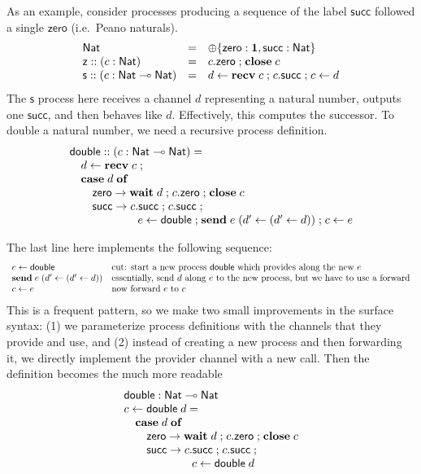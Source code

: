 \documentclass[submission,copyright,creativecommons]{eptcs}
\newcommand{\m}[1]{\mathsf{#1}}
\newcommand{\mb}[1]{\mbox{\bf #1}}
\newcommand{\semi}{\mathrel{;}}
\begin{document}
As an example, consider processes producing a sequence of the label $\m{succ}$ followed a single $\m{zero}$ (i.e.\ Peano naturals).
\[
\begin{array}{lcl}
\m{Nat} & = & \oplus\{\m{zero} : \terminate, \m{succ} : \m{Nat}\} \\
\m{z} :: (c:\m{Nat}) & = & c.\m{zero} \semi \mb{close}\; c \\
\m{s} :: (c:\m{Nat} \lolli \m{Nat}) & = & d \leftarrow \mb{recv}\; c \semi c.\m{succ} \semi c \leftarrow d
\end{array}
\]
The $\m{s}$ process here receives a channel $d$ representing a natural number, outputs one $\m{succ}$, and then behaves like $d$.  Effectively, this computes the successor.  To double a natural number, we need a recursive process definition.
\[
\begin{array}{l}
\m{double} :: (c:\m{Nat} \lolli \m{Nat}) = \\
\quad d \leftarrow \mb{recv}\; c \semi \\
\quad \mb{case}\; d\; \mb{of} \\
\quad\quad \m{zero} \rightarrow \mb{wait}\; d \semi c.\m{zero} \semi \mb{close}\; c \\
\quad\quad \m{succ} \rightarrow c.\m{succ} \semi c.\m{succ} \semi \\
\hspace{6em} e \leftarrow \m{double} \semi \mb{send}\; e\; (d' \leftarrow (d' \leftarrow d)) \semi c \leftarrow e
\end{array}
\]

The last line here implements the following sequence:
\[
\begin{array}{ll}
e \leftarrow \m{double} & \mbox{cut: start a new process $\m{double}$ which provides along the new $e$} \\
\mb{send}\; e\; (d' \leftarrow (d' \leftarrow d)) & \mbox{essentially, send $d$ along $e$ to the new process, but we have to use a forward} \\
c \leftarrow e & \mbox{now forward $e$ to $c$}
\end{array}
\]
This is a frequent pattern, so we make two small improvements in the surface syntax: (1) we parameterize process definitions with the channels that they provide and use, and (2) instead of creating a new process and then forwarding it, we directly implement the provider channel with a new call. Then the definition becomes the much more readable
\[
\begin{array}{l}
\m{double} : \m{Nat} \lolli \m{Nat} \\
c \leftarrow \m{double}\; d = \\
\quad \mb{case}\; d\; \mb{of} \\
\quad\quad \m{zero} \rightarrow \mb{wait}\; d \semi c.\m{zero} \semi \mb{close}\; c \\
\quad\quad \m{succ} \rightarrow c.\m{succ} \semi c.\m{succ} \semi \\
\hspace{6em} c \leftarrow \m{double}\; d
\end{array}
\]
\end{document}
